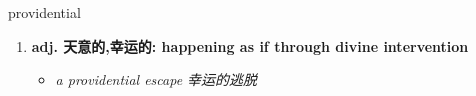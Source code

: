 
\begin{frame}
{\huge providential}
\begin{center}
\begin{enumerate}\Large
  \item \textbf{adj. 天意的,幸运的: happening as if through divine intervention}
  \begin{itemize}
    \item \em{\Large{a providential escape 幸运的逃脱}}
  \end{itemize}
\end{enumerate}
\end{center}
\end{frame}

